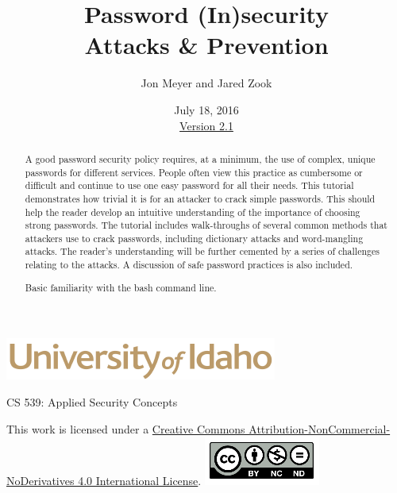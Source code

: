 \documentclass[12pt]{extarticle}
\begin{document}
\title{ Password (In)security \\ \large Attacks \& Prevention}
\author{Jon Meyer and Jared Zook}
\date{July 18, 2016 \\ \hyperref[changelog]{Version 2.1} }
\renewcommand{\abstractname}{Summary}
\begin{titlepage}
\maketitle
{}
\begin{center}
\includegraphics[scale=.5]{UofI}

\large{CS 539: Applied Security Concepts}

\vskip 40pt

\end{center}

\begin{abstract}
A good password security policy requires, at a minimum, the use of complex, unique passwords for different services. People often view this practice as cumbersome or difficult and continue to use one easy password for all their needs. This tutorial demonstrates how trivial it is for an attacker to crack simple passwords. This should help the reader develop an intuitive understanding of the importance of choosing strong passwords. The tutorial includes walk-throughs of several common methods that attackers use to crack passwords, including dictionary attacks and word-mangling attacks. The reader's understanding will be further cemented by a series of challenges relating to the attacks. A discussion of safe password practices is also included.


Basic familiarity with the bash command line.
\end{abstract}


\vfill
\begin{center}
This work is licensed under a \href{https://creativecommons.org/licenses/by-nc-nd/2.0/}{Creative Commons Attribution-NonCommercial-NoDerivatives 4.0 International License}.
\vskip 10pt
\includegraphics[scale=.5]{cc}
\end{center}

\end{titlepage}
\end{document}
